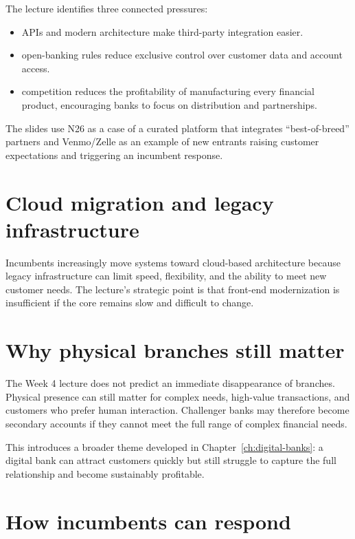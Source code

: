 The lecture identifies three connected pressures:

\begin{itemize}
  \item {} APIs and modern architecture make third-party integration easier.
  \item {} open-banking rules reduce exclusive control over customer data and account access.
  \item {} competition reduces the profitability of manufacturing every financial product, encouraging banks to focus on distribution and partnerships.
\end{itemize}

The slides use N26 as a case of a curated platform that integrates ``best-of-breed'' partners and Venmo/Zelle as an example of new entrants raising customer expectations and triggering an incumbent response.

\section{Cloud migration and legacy infrastructure}

Incumbents increasingly move systems toward cloud-based architecture because legacy infrastructure can limit speed, flexibility, and the ability to meet new customer needs. The lecture's strategic point is that front-end modernization is insufficient if the core remains slow and difficult to change.

\section{Why physical branches still matter}

The Week 4 lecture does not predict an immediate disappearance of branches. Physical presence can still matter for complex needs, high-value transactions, and customers who prefer human interaction. Challenger banks may therefore become secondary accounts if they cannot meet the full range of complex financial needs.

This introduces a broader theme developed in Chapter~\ref{ch:digital-banks}: a digital bank can attract customers quickly but still struggle to capture the full relationship and become sustainably profitable.

\section{How incumbents can respond}

